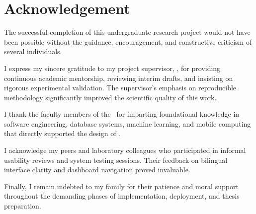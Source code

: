 \chapter*{Acknowledgement}
\thispagestyle{empty}
\vspace{0.5cm}
\noindent The successful completion of this undergraduate research project would not have been possible without the guidance, encouragement, and constructive criticism of several individuals.

\vspace{0.4cm}
\noindent I express my sincere gratitude to my project supervisor, \textbf{\SupervisorName}, for providing continuous academic mentorship, reviewing interim drafts, and insisting on rigorous experimental validation. The supervisor's emphasis on reproducible methodology significantly improved the scientific quality of this work.

\vspace{0.4cm}
\noindent I thank the faculty members of the \DepartmentName\ for imparting foundational knowledge in software engineering, database systems, machine learning, and mobile computing that directly supported the design of \HydroSmart.

\vspace{0.4cm}
\noindent I acknowledge my peers and laboratory colleagues who participated in informal usability reviews and system testing sessions. Their feedback on bilingual interface clarity and dashboard navigation proved invaluable.

\vspace{0.4cm}
\noindent Finally, I remain indebted to my family for their patience and moral support throughout the demanding phases of implementation, deployment, and thesis preparation.

\vspace{1cm}
\noindent\hfill\textbf{\StudentName}
